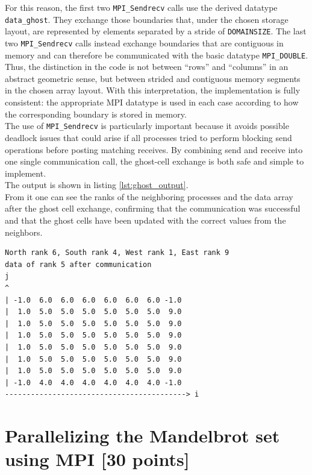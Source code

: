 \documentclass[unicode,10pt,a4paper,oneside,numbers=endperiod,openany]{scrartcl}
\begin{document}
For this reason, the first two \texttt{MPI\_Sendrecv} calls use the derived datatype \texttt{data\_ghost}. They exchange those boundaries that, under the chosen storage layout, are represented by elements separated by a stride of \texttt{DOMAINSIZE}. The last two \texttt{MPI\_Sendrecv} calls instead exchange boundaries that are contiguous in memory and can therefore be communicated with the basic datatype \texttt{MPI\_DOUBLE}.\\

Thus, the distinction in the code is not between ``rows'' and ``columns'' in an abstract geometric sense, but between strided and contiguous memory segments in the chosen array layout. With this interpretation, the implementation is fully consistent: the appropriate MPI datatype is used in each case according to how the corresponding boundary is stored in memory.\\

The use of \texttt{MPI\_Sendrecv} is particularly important because it avoids possible deadlock issues that could arise if all processes tried to perform blocking send operations before posting matching receives. By combining send and receive into one single communication call, the ghost-cell exchange is both safe and simple to implement.\\

The output is shown in listing \ref{lst:ghost_output}.\\
From it one can see the ranks of the neighboring processes and the data array after the ghost cell exchange, confirming that the communication was successful and that the ghost cells have been updated with the correct values from the neighbors.\\

\begin{lstlisting}[style=grayverbatim, caption={Output of ghost cell exchange}, label={lst:ghost_output}]
North rank 6, South rank 4, West rank 1, East rank 9
data of rank 5 after communication
j
^
| -1.0  6.0  6.0  6.0  6.0  6.0  6.0 -1.0 
|  1.0  5.0  5.0  5.0  5.0  5.0  5.0  9.0 
|  1.0  5.0  5.0  5.0  5.0  5.0  5.0  9.0 
|  1.0  5.0  5.0  5.0  5.0  5.0  5.0  9.0 
|  1.0  5.0  5.0  5.0  5.0  5.0  5.0  9.0 
|  1.0  5.0  5.0  5.0  5.0  5.0  5.0  9.0 
|  1.0  5.0  5.0  5.0  5.0  5.0  5.0  9.0 
| -1.0  4.0  4.0  4.0  4.0  4.0  4.0 -1.0 
------------------------------------------> i
\end{lstlisting}
\newpage
\section{Parallelizing the Mandelbrot set using MPI [30 points]}
\end{document}
